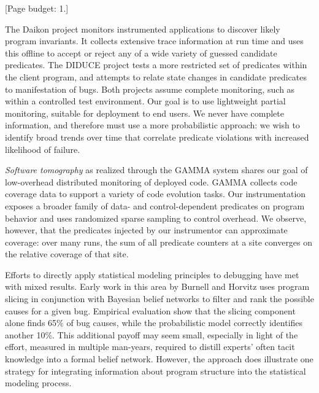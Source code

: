 \documentclass{acm_proc_article-sp}
\newcommand{\termdef}[1]{\textit{#1}}
\newcommand{\placeholder}[1]{{\color[cmyk]{0,0.61,0.87,0}[#1]}}
\begin{document}
\placeholder{Page budget: 1.}

The Daikon project \cite{ernst2001} monitors instrumented applications
to discover likely program invariants.  It collects extensive trace
information at run time and uses this offline to accept or reject any
of a wide variety of guessed candidate predicates.  The DIDUCE project
\cite{ICSE02*291} tests a more restricted set of predicates within the
client program, and attempts to relate state changes in candidate
predicates to manifestation of bugs.  Both projects assume complete
monitoring, such as within a controlled test environment.  Our goal is
to use lightweight partial monitoring, suitable for deployment to end
users.  We never have complete information, and therefore must use a
more probabilistic approach: we wish to identify broad trends over
time that correlate predicate violations with increased likelihood of
failure.

\termdef{Software tomography} as realized through the GAMMA system
\cite{PASTE'02*2,Orso:2003:LFDIART} shares our goal of low-overhead
distributed monitoring of deployed code.  GAMMA collects code coverage
data to support a variety of code evolution tasks.  Our
instrumentation exposes a broader family of data- and
control-dependent predicates on program behavior and uses randomized
sparse sampling to control overhead.  We observe, however, that the
predicates injected by our instrumentor can approximate coverage: over
many runs, the sum of all predicate counters at a site converges on
the relative coverage of that site.

Efforts to directly apply statistical modeling principles to debugging
have met with mixed results.  Early work in this area by Burnell and
Horvitz \cite{Burnell:1995:SCM} uses program slicing in conjunction
with Bayesian belief networks to filter and rank the possible causes
for a given bug.  Empirical evaluation show that the slicing component
alone finds 65\% of bug causes, while the probabilistic model
correctly identifies another 10\%.  This additional payoff may seem
small, especially in light of the effort, measured in multiple
man-years, required to distill experts' often tacit knowledge into a
formal belief network.  However, the approach does illustrate one
strategy for integrating information about program structure into the
statistical modeling process.
\end{document}
